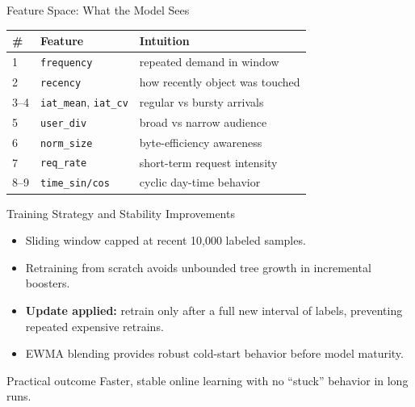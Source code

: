 \documentclass[11pt,aspectratio=169]{beamer}
\begin{document}
\begin{frame}{Feature Space: What the Model Sees}
  \small
  \begin{table}
    \centering
    \begin{tabular}{lll}
      \toprule
      \# & Feature & Intuition \\
      \midrule
      1 & \texttt{frequency} & repeated demand in window \\
      2 & \texttt{recency} & how recently object was touched \\
      3--4 & \texttt{iat\_mean}, \texttt{iat\_cv} & regular vs bursty arrivals \\
      5 & \texttt{user\_div} & broad vs narrow audience \\
      6 & \texttt{norm\_size} & byte-efficiency awareness \\
      7 & \texttt{req\_rate} & short-term request intensity \\
      8--9 & \texttt{time\_sin/cos} & cyclic day-time behavior \\
      \bottomrule
    \end{tabular}
  \end{table}
\end{frame}

\begin{frame}{Training Strategy and Stability Improvements}
  \begin{itemize}
    \item Sliding window capped at recent 10,000 labeled samples.
    \item Retraining from scratch avoids unbounded tree growth in incremental boosters.
    \item \textbf{Update applied:} retrain only after a full new interval of labels, preventing repeated expensive retrains.
    \item EWMA blending provides robust cold-start behavior before model maturity.
  \end{itemize}
  \begin{block}{Practical outcome}
    Faster, stable online learning with no ``stuck'' behavior in long runs.
  \end{block}
\end{frame}
\end{document}
